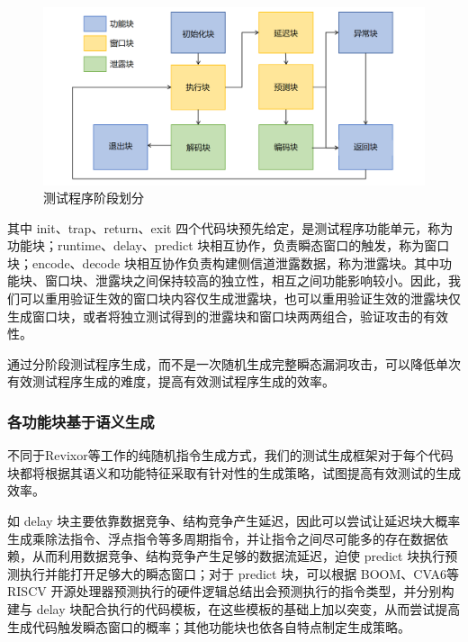 \begin{figure}[!h]
    \centering
    \includegraphics[width=\linewidth]{figure/proposal/block-partition.png}
    \caption{测试程序阶段划分}
    \label{review:block-partition}
\end{figure}

其中 init、trap、return、exit 四个代码块预先给定，是测试程序功能单元，称为功能块；runtime、delay、predict 块相互协作，负责瞬态窗口的触发，称为窗口块；encode、decode 块相互协作负责构建侧信道泄露数据，称为泄露块。其中功能块、窗口块、泄露块之间保持较高的独立性，相互之间功能影响较小。因此，我们可以重用验证生效的窗口块内容仅生成泄露块，也可以重用验证生效的泄露块仅生成窗口块，或者将独立测试得到的泄露块和窗口块两两组合，验证攻击的有效性。\par

通过分阶段测试程序生成，而不是一次随机生成完整瞬态漏洞攻击，可以降低单次有效测试程序生成的难度，提高有效测试程序生成的效率。

\subsubsection{各功能块基于语义生成}

不同于Revixor\cite{oleksenko2022revizor}等工作的纯随机指令生成方式，我们的测试生成框架对于每个代码块都将根据其语义和功能特征采取有针对性的生成策略，试图提高有效测试的生成效率。\par

如 delay 块主要依靠数据竞争、结构竞争产生延迟\cite{riscv-test}，因此可以尝试让延迟块大概率生成乘除法指令、浮点指令等多周期指令，并让指令之间尽可能多的存在数据依赖，从而利用数据竞争、结构竞争产生足够的数据流延迟，迫使 predict 块执行预测执行并能打开足够大的瞬态窗口；对于 predict 块，可以根据 BOOM\cite{celio2017boomv2}、CVA6\cite{zaruba2019cost}等 RISCV 开源处理器预测执行的硬件逻辑总结出会预测执行的指令类型，并分别构建与 delay 块配合执行的代码模板，在这些模板的基础上加以突变，从而尝试提高生成代码触发瞬态窗口的概率；其他功能块也依各自特点制定生成策略。\par

